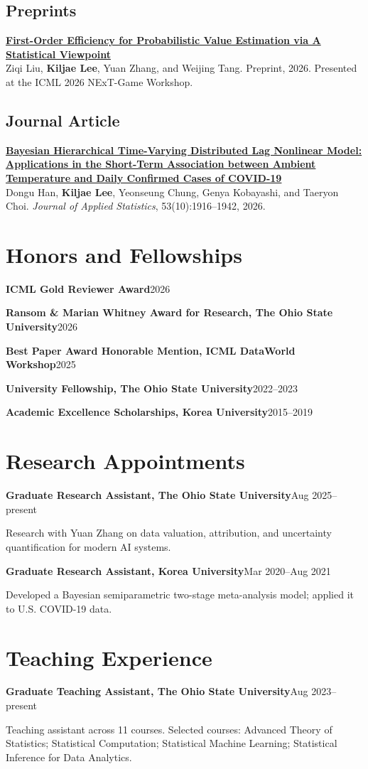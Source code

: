 \documentclass[letterpaper,11pt]{article}
\newcommand{\pub}[3]{%
  \textbf{#2}\\[-1pt]
  #1. {\color{muted}#3}\par\vspace{4pt}
}
\newcommand{\lineentry}[2]{%
  \textbf{#1}\hfill {\color{muted}#2}\par\vspace{2pt}
}
\begin{document}
\subsection{Preprints}
\pub{Ziqi Liu, \textbf{Kiljae Lee}, Yuan Zhang, and Weijing Tang}
  {\href{https://arxiv.org/abs/2605.02827}{First-Order Efficiency for Probabilistic Value Estimation via A Statistical Viewpoint}}
  {Preprint, 2026. Presented at the ICML 2026 NExT-Game Workshop.}

\subsection{Journal Article}
\pub{Dongu Han, \textbf{Kiljae Lee}, Yeonseung Chung, Genya Kobayashi, and Taeryon Choi}
  {\href{https://doi.org/10.1080/02664763.2025.2577659}{Bayesian Hierarchical Time-Varying Distributed Lag Nonlinear Model: Applications in the Short-Term Association between Ambient Temperature and Daily Confirmed Cases of COVID-19}}
  {\emph{Journal of Applied Statistics}, 53(10):1916--1942, 2026.}

\section{Honors and Fellowships}
\lineentry{ICML Gold Reviewer Award}{2026}
\lineentry{Ransom \& Marian Whitney Award for Research, The Ohio State University}{2026}
\lineentry{Best Paper Award Honorable Mention, ICML DataWorld Workshop}{2025}
\lineentry{University Fellowship, The Ohio State University}{2022--2023}
\lineentry{Academic Excellence Scholarships, Korea University}{2015--2019}

\section{Research Appointments}
\lineentry{Graduate Research Assistant, The Ohio State University}{Aug 2025--present}
Research with Yuan Zhang on data valuation, attribution, and uncertainty quantification for modern AI systems.\par\vspace{5pt}
\lineentry{Graduate Research Assistant, Korea University}{Mar 2020--Aug 2021}
Developed a Bayesian semiparametric two-stage meta-analysis model; applied it to U.S. COVID-19 data.

\section{Teaching Experience}
\lineentry{Graduate Teaching Assistant, The Ohio State University}{Aug 2023--present}
Teaching assistant across 11 courses. Selected courses: Advanced Theory of Statistics; Statistical Computation; Statistical Machine Learning; Statistical Inference for Data Analytics.
\end{document}
